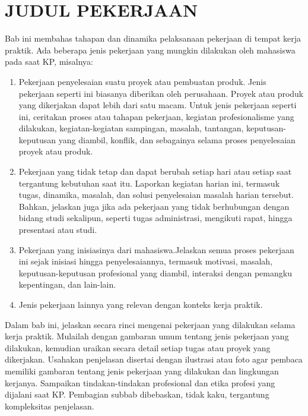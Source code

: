 \cleardoublepage
\chapter{JUDUL PEKERJAAN}
\label{chap:judul-pekerjaan}
Bab ini membahas tahapan dan dinamika pelaksanaan pekerjaan di tempat kerja praktik. Ada beberapa jenis pekerjaan yang mungkin dilakukan oleh mahasiswa pada saat KP, misalnya:
\begin{enumerate}[1.]
    \item Pekerjaan penyelesaian suatu proyek atau pembuatan produk. Jenis pekerjaan seperti ini biasanya diberikan oleh perusahaan. Proyek atau produk yang dikerjakan dapat lebih dari satu macam. Untuk jenis pekerjaan seperti ini, ceritakan proses atau tahapan pekerjaan, kegiatan profesionalisme yang dilakukan, kegiatan-kegiatan sampingan, masalah, tantangan, keputusan-keputusan yang diambil, konflik, dan sebagainya selama proses penyelesaian proyek atau produk.
    \item Pekerjaan yang tidak tetap dan dapat berubah setiap hari atau setiap saat tergantung kebutuhan saat itu. Laporkan kegiatan harian ini, termasuk tugas, dinamika, masalah, dan solusi penyelesaian masalah harian tersebut. Bahkan, jelaskan juga jika ada pekerjaan yang tidak berhubungan dengan bidang studi sekalipun, seperti tugas administrasi, mengikuti rapat, hingga presentasi atau studi.
    \item Pekerjaan yang inisiasinya dari mahasiswa.Jelaskan semua proses pekerjaan ini sejak inisiasi hingga penyelesaiannya, termasuk motivasi, masalah, keputusan-keputusan profesional yang diambil, interaksi dengan pemangku kepentingan, dan lain-lain.
    \item Jenis pekerjaan lainnya yang relevan dengan konteks kerja praktik.
\end{enumerate}
Dalam bab ini, jelaskan secara rinci mengenai pekerjaan yang dilakukan selama kerja praktik. Mulailah dengan gambaran umum tentang jenis pekerjaan yang dilakukan, kemudian uraikan secara detail setiap tugas atau proyek yang dikerjakan.
Usahakan penjelasan disertai dengan ilustrasi atau foto agar pembaca memiliki gambaran tentang jenis pekerjaan yang dilakukan dan lingkungan kerjanya. Sampaikan tindakan-tindakan profesional dan etika profesi yang dijalani saat KP. Pembagian subbab dibebaskan, tidak kaku, tergantung kompleksitas penjelasan. 

